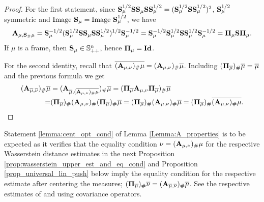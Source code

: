 \documentclass{amsart}
\numberwithin{equation}{section}
\newcommand\bS{{\bf S}}
\newcommand\id{{\operatorname{\bf Id}}}
\theoremstyle{plain}
\theoremstyle{definition}
\begin{document}
\begin{proof}
For the first statement, since $ {\bf S}^{1/2}_{\mu}{\bf S} {\bf S}_{\mu} {\bf S} {\bf S}^{1/2}_{\mu}= ({\bf S}^{1/2}_{\mu}{\bf S} {\bf S}_{\mu}^{1/2})^2$, $\bS^{1/2}_{\mu}$ symmetric and  $\text{Image } \bS_{\mu} = \text{Image } \bS^{1/2}_{\mu}$, we have 
$${\bf A}_{\mu, {\bf S}_{\#}\mu}={\bf S}^{-1/2}_{\mu}({\bf S}^{1/2}_{\mu}{\bf S} {\bf S}_{\mu} {\bf S} {\bf S}^{1/2}_{\mu})^{1/2}{\bf S}^{-1/2}_{\mu}= {\bf S}_{\mu}^{-1/2}{\bf S}^{1/2}_{\mu}{\bf S} {\bf S}_{\mu}^{1/2}{\bf S}_{\mu}^{-1/2} = {\bf \Pi}_{\mu}{\bf S}{\bf \Pi}_{\mu}.
$$
If $\mu$ is a frame, then $ \bS_{\mu} \in {\mathbb S}^n_{++}$, hence ${\bf \Pi}_{\mu}={\bf \id}$.


 
For the second identity, recall that $\overline{({\bf A}_{\mu, \nu})_{\#}\mu}=({\bf A}_{\mu, \nu})_{\#}\overline{\mu}$. Including $ ({\bf \Pi}_{\overline{\mu}})_{\#}\overline{\mu}=\overline{\mu} $ and the previous formula we get  
\[
\begin{split}
 ({\bf A}_{\overline{\mu}, \overline{ \nu}})_{\#}\overline{\mu}&=({\bf A}_{\overline{\mu}, (\overline{ {\bf A}_{\mu, \nu} )_{\#} \mu}})_{\#}\overline{\mu} = ({\bf \Pi}_{\overline{\mu}}{\bf A}_{\mu, \nu}{\bf \Pi}_{\overline{\mu}})_{\#}\overline{\mu}\\ 
 =&({\bf \Pi}_{\overline{\mu}})_{\#}({\bf A}_{\mu, \nu})_{\#}({\bf \Pi}_{\overline{\mu}})_{\#}\overline{\mu}= ({\bf \Pi}_{\overline{\mu}})_{\#}({\bf A}_{\mu, \nu})_{\#}\overline{\mu}=
 ({\bf \Pi}_{\overline{\mu}})_{\#} \overline{({\bf A}_{\mu, \nu})_{\#}\mu}.   
\end{split}
\] 
 
\end{proof}
Statement \ref{lemma:cent_opt_cond} of Lemma \ref{Lemma:A_properties} is to be expected as it verifies that the equality 
condition $\nu=({\bf A}_{\mu, \nu})_{\#}\mu$ for the respective Wasserstein distance estimates in the next Proposition \ref{prop:wasserstein_upper_est_and_eq_cond} and Proposition \ref{prop_universal_lin_push} below imply the equality condition for the respective estimate  
after centering the measures; $({\bf \Pi}_{\overline{\mu}})_{\#}\overline{\nu}=({\bf A}_{\overline{\mu}, \overline{\nu}})_{\#}\overline{\mu}$. 
See the respective estimates of \cite{Gelbrich90} and \cite{cuesta1996lower} using covariance operators. 
\end{document}
